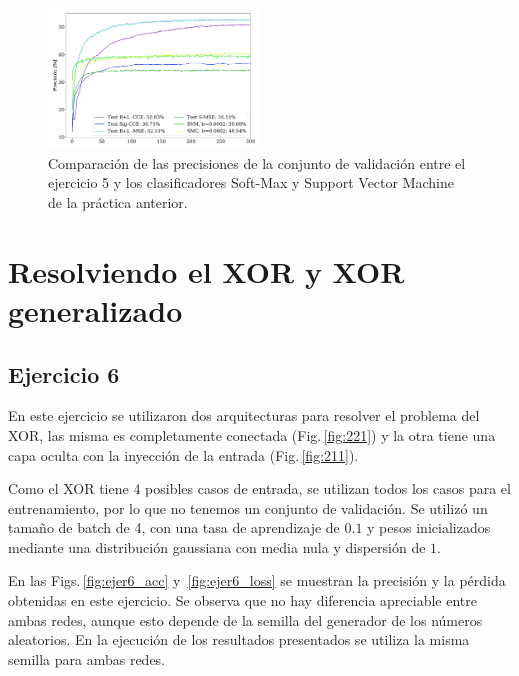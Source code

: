 \begin{figure}[H]
    \begin{small}
        \begin{center}
            \includegraphics[width=0.5\textwidth]{Graphs/ejer5_acc_all.pdf}
        \end{center}
        \caption{Comparación de las precisiones de la conjunto de validación entre el ejercicio 5 y los clasificadores Soft-Max y Support Vector Machine de la práctica anterior.}
        \label{fig:ejer5_acc_all}
    \end{small}
\end{figure}


\section*{Resolviendo el XOR y XOR generalizado}

\subsection*{Ejercicio 6}

En este ejercicio se utilizaron dos arquitecturas para resolver el problema del XOR, las misma es completamente conectada (Fig.\,\ref{fig:221}) y la otra tiene una capa oculta con la inyección de la entrada (Fig.\,\ref{fig:211}). 

Como el XOR tiene 4 posibles casos de entrada, se utilizan todos los casos para el entrenamiento, por lo que no tenemos un conjunto de validación.  Se utilizó un tamaño de batch de 4, con una tasa de aprendizaje de $0.1$ y pesos inicializados mediante una distribución gaussiana con media nula y dispersión de $1$. 


En las Figs.\,\ref{fig:ejer6_acc} y \,\ref{fig:ejer6_loss} se muestran la precisión y la pérdida obtenidas en este ejercicio. Se observa que no hay diferencia apreciable entre ambas redes, aunque esto depende de la semilla del generador de los números aleatorios. En la ejecución de los resultados presentados se utiliza la misma semilla para ambas redes.


